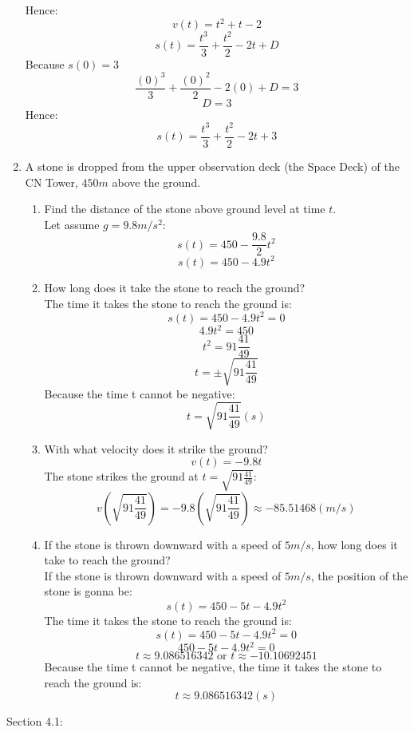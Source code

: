 \documentclass[12pt]{article}
\begin{document}
\begin{enumerate}
    Hence:
    \[v(t) = t^2 + t -2\]
    \[s(t) = \frac{t^3}{3} + \frac{t^2}{2} - 2t + D\]
    Because $s(0) = 3$
    \[\frac{(0)^3}{3} + \frac{(0)^2}{2} -2(0) + D = 3\]
    \[D = 3\]
    Hence:
    \[s(t) = \frac{t^3}{3} + \frac{t^2}{2} -2t + 3\]
    \setcounter{enumi}{64}
    \item A stone is dropped from the upper observation deck (the Space Deck) of the CN Tower, $450m$ above the ground.
    \begin{enumerate}
        \item Find the distance of the stone above ground level at time $t$.\\
        Let assume $g = 9.8m/s^2$:
        \[s(t) = 450 - \frac{9.8}{2}t^2\]
        \[s(t) = 450 - 4.9t^2\]
        \item How long does it take the stone to reach the ground?\\
        The time it takes the stone to reach the ground is:
        \[s(t) = 450 - 4.9t^2 = 0\]
        \[4.9t^2 = 450\]
        \[t^2 = 91\frac{41}{49}\]
        \[t = \pm\sqrt{91\frac{41}{49}}\]
        Because the time t cannot be negative:
        \[t = \sqrt{91\frac{41}{49}}(s)\]
        \item With what velocity does it strike the ground?
        \[v(t) = -9.8t\]
        The stone strikes the ground at $t = \sqrt{91\frac{41}{49}}$:
        \[v(\sqrt{91\frac{41}{49}}) = -9.8(\sqrt{91\frac{41}{49}}) \approx -85.51468(m/s)\]
        \item If the stone is thrown downward with a speed of $5m/s$, how long does it take to reach the ground?\\
        If the stone is thrown downward with a speed of $5m/s$, the position of the stone is gonna be:
        \[s(t) = 450 - 5t - 4.9t^2\]
        The time it takes the stone to reach the ground is:
        \[s(t) = 450 - 5t - 4.9t^2 = 0\]
        \[450 - 5t - 4.9t^2 = 0\]
        \[t \approx 9.086516342 \text{ or } t \approx -10.10692451\]
        Because the time t cannot be negative, the time it takes the stone to reach the ground is:
        \[t \approx 9.086516342(s)\]
    \end{enumerate}
\end{enumerate}
\newpage
Section 4.1:
\end{document}
